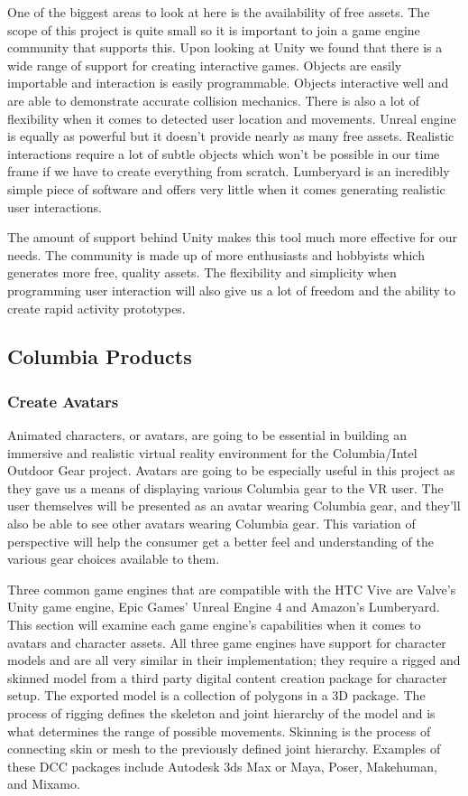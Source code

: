 \documentclass[10pt,journal,compsoc,onecolumn, draftclsnofoot]{IEEEtran}
\begin{document}
One of the biggest areas to look at here is the availability of free assets.
The scope of this project is quite small so it is important to join a game engine community that supports this.
Upon looking at Unity we found that there is a wide range of support for creating interactive games\cite{unity_getting_started}.
Objects are easily importable and interaction is easily programmable.
Objects interactive well and are able to demonstrate accurate collision mechanics.
There is also a lot of flexibility when it comes to detected user location and movements.
Unreal engine is equally as powerful\cite{unreal_animation} but it doesn’t provide nearly as many free assets.
Realistic interactions require a lot of subtle objects which won’t be possible in our time frame if we have to create everything from scratch.
Lumberyard is an incredibly simple piece of software and offers very little when it comes generating realistic user interactions\cite{lumberyard_object_system}.

The amount of support behind Unity makes this tool much more effective for our needs.
The community is made up of more enthusiasts and hobbyists which generates more free, quality assets.
The flexibility and simplicity when programming user interaction will also give us a lot of freedom and the ability to create rapid activity prototypes.
\vspace{2mm}


\subsection{Columbia Products}
\subsubsection{Create Avatars}
Animated characters, or avatars, are going to be essential in building an immersive and realistic virtual reality environment for the Columbia/Intel Outdoor Gear project. Avatars are going to be especially useful in this project as they gave us a means of displaying various Columbia gear to the VR user. The user themselves will be presented as an avatar wearing Columbia gear, and they'll also be able to see other avatars wearing Columbia gear. This variation of perspective will help the consumer get a better feel and understanding of the various gear choices available to them.

Three common game engines that are compatible with the HTC Vive are Valve's Unity game engine, Epic Games' Unreal Engine 4 and Amazon's Lumberyard. This section will examine each game engine's capabilities when it comes to avatars and character assets. All three game engines have support for character models and are all very similar in their implementation; they require a rigged and skinned model from a third party digital content creation package for character setup. The exported model is a collection of polygons in a 3D package. The process of rigging defines the skeleton and joint hierarchy of the model and is what determines the range of possible movements. Skinning is the process of connecting skin or mesh to the previously defined joint hierarchy\cite{unity_character}. Examples of these DCC packages include Autodesk 3ds Max or Maya, Poser, Makehuman, and Mixamo.
\end{document}
